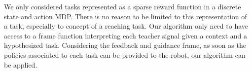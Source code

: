 We only considered tasks represented as a sparse reward function in a discrete state and action MDP. There is no reason to be limited to this representation of a task, especially to concept of a reaching task. Our algorithm only need to have access to a frame function interpreting each teacher signal given a context and a hypothesized task. Considering the feedback and guidance frame, as soon as the policies associated to each task can be provided to the robot, our algorithm can be applied. 







